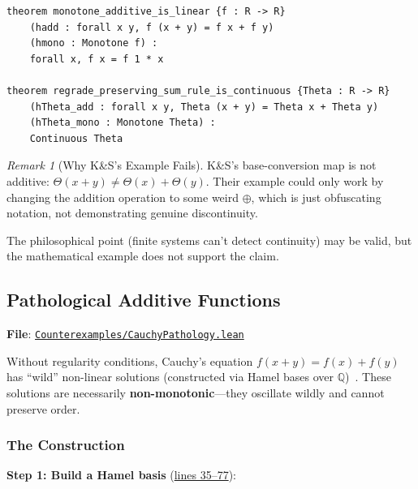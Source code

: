 \documentclass[11pt]{article}
\theoremstyle{definition}
\theoremstyle{remark}
\newtheorem{remark}[theorem]{Remark}
\begin{document}
\begin{lstlisting}[caption={Monotone additive functions are linear (\href{https://github.com/zariuq/ks-foundations-of-inference/blob/main/KnuthSkilling/Counterexamples/RegradeCounterexample.lean\#L100}{RegradeCounterexample.lean:100})},numbers=none]
theorem monotone_additive_is_linear {f : R -> R}
    (hadd : forall x y, f (x + y) = f x + f y)
    (hmono : Monotone f) :
    forall x, f x = f 1 * x

theorem regrade_preserving_sum_rule_is_continuous {Theta : R -> R}
    (hTheta_add : forall x y, Theta (x + y) = Theta x + Theta y)
    (hTheta_mono : Monotone Theta) :
    Continuous Theta
\end{lstlisting}

\begin{remark}[Why K\&S's Example Fails]
K\&S's base-conversion map is not additive: $\Theta(x + y) \neq \Theta(x) + \Theta(y)$.
Their example could only work by changing the addition operation to some weird $\oplus$,
which is just obfuscating notation, not demonstrating genuine discontinuity.

The philosophical point (finite systems can't detect continuity) may be valid,
but the mathematical example does not support the claim.
\end{remark}

\subsection{Pathological Additive Functions}

\textbf{File}: \href{https://github.com/zariuq/ks-foundations-of-inference/blob/main/KnuthSkilling/Counterexamples/CauchyPathology.lean}{\texttt{Counterexamples/CauchyPathology.lean}}

Without regularity conditions, Cauchy's equation $f(x+y) = f(x) + f(y)$ has
``wild'' non-linear solutions (constructed via Hamel bases over $\mathbb{Q}$)~\cite{Aczel1966}.
These solutions are necessarily \textbf{non-monotonic}---they oscillate wildly
and cannot preserve order.

\subsubsection{The Construction}

\textbf{Step 1: Build a Hamel basis} (\href{https://github.com/zariuq/ks-foundations-of-inference/blob/main/KnuthSkilling/Counterexamples/CauchyPathology.lean\#L35-L77}{lines 35--77}):
\end{document}
